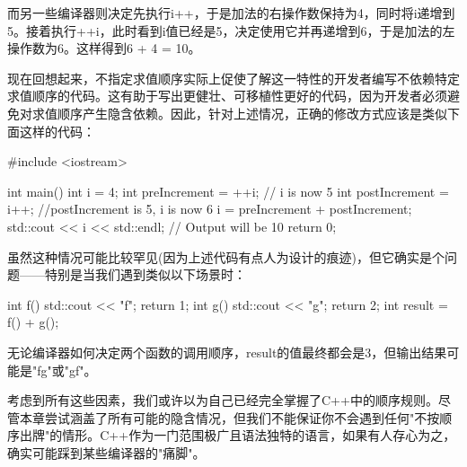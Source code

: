 而另一些编译器则决定先执行i++，于是加法的右操作数保持为4，同时将i递增到5。接着执行++i，此时看到i值已经是5，决定使用它并再递增到6，于是加法的左操作数为6。这样得到6 + 4 = 10。

现在回想起来，不指定求值顺序实际上促使了解这一特性的开发者编写不依赖特定求值顺序的代码。这有助于写出更健壮、可移植性更好的代码，因为开发者必须避免对求值顺序产生隐含依赖。因此，针对上述情况，正确的修改方式应该是类似下面这样的代码：

\begin{cpp}
#include <iostream>

int main() {
  int i = 4;
  int preIncrement = ++i; // i is now 5
  int postIncrement = i++; //postIncrement is 5, i is now 6
  i = preIncrement + postIncrement;
  std::cout << i << std::endl; // Output will be 10
  return 0;
}
\end{cpp}

虽然这种情况可能比较罕见(因为上述代码有点人为设计的痕迹)，但它确实是个问题——特别是当我们遇到类似以下场景时：

\begin{cpp}
int f() { std::cout << "f"; return 1; }
int g() { std::cout << "g"; return 2; }
int result = f() + g();
\end{cpp}

无论编译器如何决定两个函数的调用顺序，result的值最终都会是3，但输出结果可能是"fg"或"gf"。

考虑到所有这些因素，我们或许以为自己已经完全掌握了C++中的顺序规则。尽管本章尝试涵盖了所有可能的隐含情况，但我们不能保证你不会遇到任何"不按顺序出牌"的情形。C++作为一门范围极广且语法独特的语言，如果有人存心为之，确实可能踩到某些编译器的"痛脚"。

